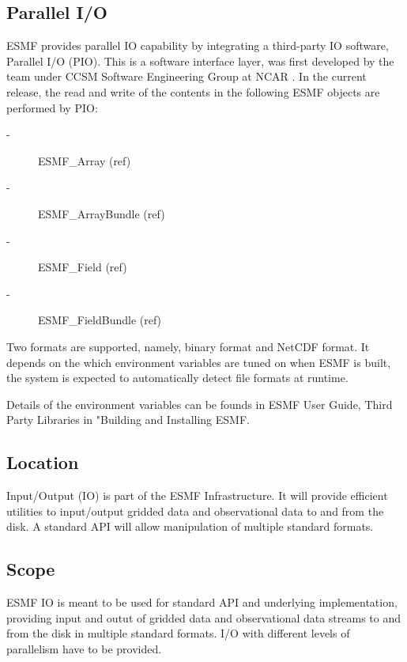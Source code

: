 

\subsection{Parallel I/O}

ESMF provides parallel IO capability by integrating a third-party IO
software, Parallel I/O (PIO). This is a software interface layer, was 
first developed by the team under CCSM Software Engineering Group at NCAR
\cite{CESM_Site}. In the current release, the read and write of the 
contents in the following ESMF objects are performed by PIO:

\begin{description}
\item[-] ESMF\_Array (ref)
\item[-] ESMF\_ArrayBundle (ref)
\item[-] ESMF\_Field (ref)
\item[-] ESMF\_FieldBundle (ref)
\end{description}

Two formats are supported, namely, binary format and NetCDF format.  
It depends on the which environment variables are tuned on when ESMF is built,
the system is expected to automatically detect file formats at runtime.

Details of the environment variables can be founds in ESMF User Guide, 
Third Party Libraries in "Building and Installing ESMF.



\subsection{Location}

Input/Output (IO) is part of the ESMF Infrastructure.  It will provide
efficient utilities to input/output gridded data and observational data
to and from the disk. A standard API will allow manipulation of multiple
standard formats.


\subsection{Scope}

ESMF IO is meant to be used for standard API and underlying implementation, 
providing input and outut of gridded data and observational data streams to 
and from the disk in multiple standard formats. I/O with different levels of 
parallelism have to be provided.  




